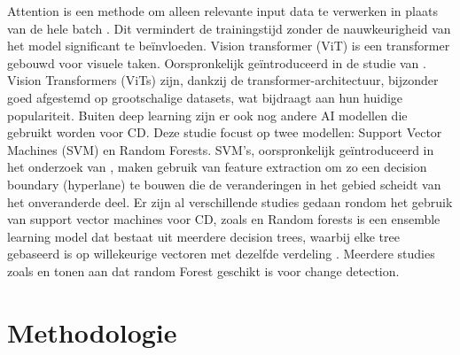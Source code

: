 Attention is een methode om alleen relevante input data te verwerken in plaats van de hele batch \autocite{Geron2022}. 
Dit vermindert de trainingstijd zonder de nauwkeurigheid van het model significant te beïnvloeden. Vision transformer (ViT) is 
een transformer gebouwd voor visuele taken. Oorspronkelijk geïntroduceerd in de studie van \textcite{dosovitskiy2020image}. 
Vision Transformers (ViTs) zijn, dankzij de transformer-architectuur, bijzonder goed afgestemd op grootschalige datasets, 
wat bijdraagt aan hun huidige populariteit.
Buiten deep learning zijn er ook nog andere AI modellen die gebruikt worden voor CD.
Deze studie focust op twee modellen: Support Vector Machines (SVM) en Random Forests.
SVM's, oorspronkelijk geïntroduceerd in het onderzoek van \textcite{cortes1995support}, maken gebruik van feature extraction om zo een 
decision boundary (hyperlane) te bouwen die de veranderingen in het gebied scheidt van het onveranderde deel. 
Er zijn al verschillende studies gedaan rondom het gebruik van support vector machines voor CD, zoals \textcite{bovolo2008novel} en \textcite{Habib_2009}
Random forests is een ensemble learning model dat bestaat uit meerdere decision trees, 
waarbij elke tree gebaseerd is op willekeurige vectoren met dezelfde verdeling \autocite{Breiman_2001}. Meerdere studies zoals 
\textcite{Wessels_2016} en \textcite{Feng_2018} tonen aan dat random Forest geschikt is voor change detection.



\section{Methodologie}%
\label{sec:methodologie}


